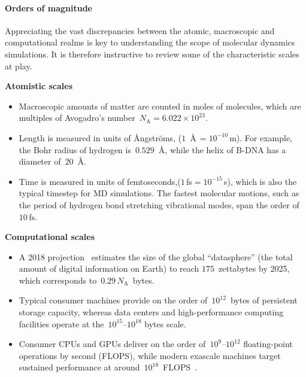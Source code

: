 \paragraph{Orders of magnitude}
{
Appreciating the vast discrepancies between the atomic, macroscopic and computational realms is key to understanding the scope of molecular dynamics simulations. It is therefore instructive to review some of the characteristic scales at play.

\noindent
\begin{minipage}[t]{0.48\textwidth}
\textbf{Atomistic scales}
\begin{itemize}
    \item Macroscopic amounts of matter are counted in moles of molecules, which are multiples of Avogadro's number~$N_{\mathrm{A}}=6.022\times 10^{23}$.
    \item Length is measured in units of {\AA ngstr\"oms}, ($1$~\AA$\,=10^{-10}\,\mathrm{m}$). For example, the Bohr radius of hydrogen is~$0.529$~\AA, while the helix of B-DNA has a diameter of~$20$~\AA.
    \item Time is measured in units of femtoseconds,($1$\,fs$=10^{-15}$\,s), which is also the typical timestep for MD simulations. The fastest molecular motions, such as the period of hydrogen bond stretching vibrational modes, span the order of~$10\,\mathrm{fs}$.
\end{itemize}
\end{minipage}\hfill
\begin{minipage}[t]{0.48\textwidth}
\textbf{Computational scales}
\begin{itemize}
  \item A 2018 projection~\cite{RGR18} estimates the size of the global ``datasphere'' (the total amount of digital information on Earth) to reach $175$~zettabytes by 2025, which corresponds to~$0.29\,N_{\mathrm{A}}$~bytes.
  \item Typical consumer machines provide on the order of~$10^{12}$~bytes of persistent storage capacity, whereas data centers and high-performance computing facilities operate at the~$10^{15}$--$10^{18}$ bytes scale.
  \item Consumer CPUs and GPUs deliver on the order of~$10^{9}$--$10^{12}$ floating-point operations by second (FLOPS), while modern exascale machines target sustained performance at around~$10^{18}$~FLOPS~\cite{Sc22}.
\end{itemize}
\end{minipage}
}
\newline\newline
